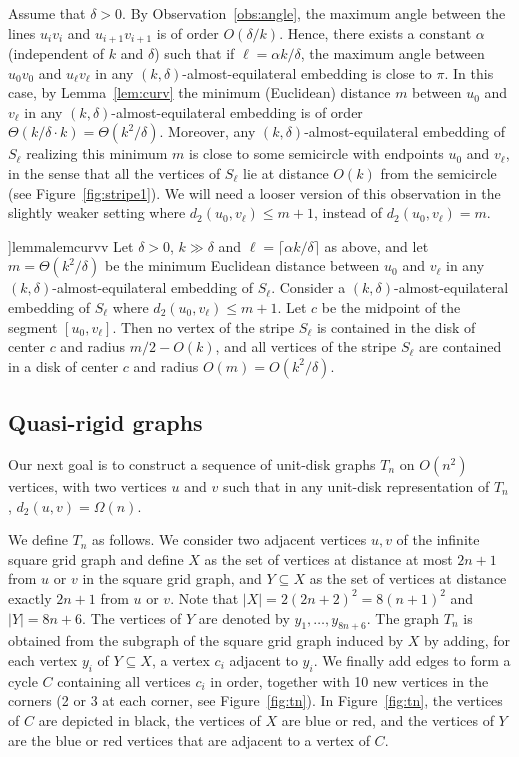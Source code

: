 \documentclass[a4paper,reqno, 12pt]{amsart}
\newcommand{\apx}[1]{\hyperref[#1]{\Rightscissors}}
\begin{document}
Assume that $\delta>0$. By Observation~\ref{obs:angle}, the maximum angle between the lines $u_{i}v_i$
and $u_{i+1}v_{i+1}$ is of order $O(\delta/k)$. 
Hence, there exists a
constant $\alpha$ (independent of $k$ and $\delta$) such that if
$\ell=\alpha k/\delta$, the maximum angle between
$u_0v_0$ and $u_{\ell}v_\ell$ in any $(k,\delta)$-almost-equilateral embedding is close to $\pi$.
In this case, by Lemma~\ref{lem:curv} the
minimum (Euclidean) distance $m$ between $u_0$ and $v_\ell$ in any $(k,\delta)$-almost-equilateral embedding is of order
$\Theta(k/\delta \cdot k)=\Theta(k^2/\delta)$. Moreover, any $(k,\delta)$-almost-equilateral embedding of
$S_{\ell}$ realizing this minimum $m$ is close to some semicircle
with
endpoints $u_0$ and $v_\ell$, in the sense that all the vertices of
$S_\ell$ lie at distance $O(k)$ from the semicircle (see Figure~\ref{fig:stripe1}). We will need a looser version of this observation in the
slightly weaker setting where $d_2(u_0,v_\ell)\le m+1$, instead of
$d_2(u_0,v_\ell)=m$.

\begin{restatable}[\apx{sec:prstri}]{lemma}{lemcurvv}\label{lem:curv2}
Let $\delta>0$, $k\gg\delta$ and $\ell=\lceil \alpha k/\delta\rceil$ as above, and let $m= \Theta(k^2/\delta)$ be the minimum Euclidean distance between $u_0$ and $v_\ell$
in any $(k,\delta)$-almost-equilateral embedding of $S_\ell$. Consider a $(k,\delta)$-almost-equilateral embedding of $S_\ell$ where
$d_2(u_0,v_\ell)\le m+1$. Let $c$ be the midpoint of the segment
$[u_0,v_\ell]$. Then no vertex of the stripe $S_\ell$ is contained in
the disk of center $c$ and radius $m/2-O(k)$, and all vertices of the
stripe $S_\ell$ are contained in a disk of center $c$ and  radius  $O(m)=O(k^2/\delta)$.
\end{restatable}

\subsection{Quasi-rigid graphs}\label{sec:qrg}

Our next goal is to construct a sequence of unit-disk graphs
$T_n$ on $O(n^2)$ vertices, with two vertices
$u$ and $v$ such that in any unit-disk representation of $T_n$,
$d_2(u,v)=\Omega(n)$.

We define $T_n$ as follows. We consider two adjacent vertices $u,v$ of
the infinite square grid graph and define $X$ as the set of vertices at
distance at most $2n+1$ from $u$ or $v$ in the square grid graph, and $Y\subseteq
X$ as the set of vertices at distance exactly $2n+1$ from $u$ or
$v$. Note that $|X|=2(2n+2)^2=8(n+1)^2$ and $|Y|=8n+6$. The vertices of $Y$ are denoted by $y_1,\ldots,y_{8n+6}$. The graph
$T_n$ is obtained from the subgraph of the square grid graph induced by $X$
by adding, for each vertex $y_i$ of $Y\subseteq
X$, a vertex $c_i$ adjacent
to $y_i$. We finally add edges to form a cycle $C$ containing all vertices
$c_i$ in order, together with 10 new vertices in the corners (2 or 3 at each corner, see
Figure~\ref{fig:tn}). In Figure~\ref{fig:tn}, the vertices of $C$ are
depicted in black, the vertices of $X$ are blue or red, and the
vertices of $Y$ are the blue or red vertices that are
adjacent to a vertex of $C$.
\end{document}
